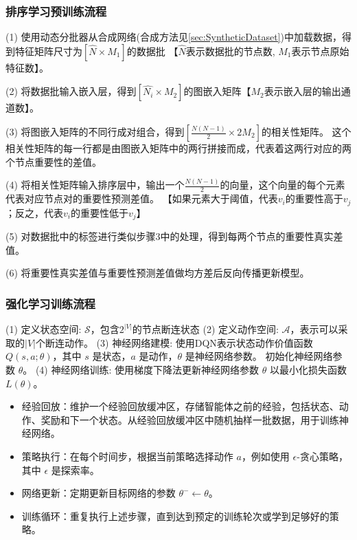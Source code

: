 \documentclass[twocolumn]{morningstar}
\begin{document}
\subsubsection{排序学习预训练流程}




(1) 使用动态分批器从合成网络(合成方法见\ref{sec:SyntheticDataset})中加载数据，得到特征矩阵尺寸为$[\hat{N}\times M_1]$的数据批
【$\hat{N}$表示数据批的节点数, $M_1$表示节点原始特征数】。

(2) 将数据批输入嵌入层，得到$[\hat{N_i}\times M_2]$的图嵌入矩阵【$M_2$表示嵌入层的输出通道数】。

(3) 将图嵌入矩阵的不同行成对组合，得到$[\frac{N(N-1)}{2} \times 2M_2]$的相关性矩阵。
这个相关性矩阵的每一行都是由图嵌入矩阵中的两行拼接而成，代表着这两行对应的两个节点重要性的差值。

(4) 将相关性矩阵输入排序层中，输出一个$\frac{N(N-1)}{2}$的向量，这个向量的每个元素代表对应节点对的重要性预测差值。
【如果元素大于阈值，代表$v_i$的重要性高于$v_j$；反之，代表$v_i$的重要性低于$v_j$】

(5) 对数据批中的标签进行类似步骤3中的处理，得到每两个节点的重要性真实差值。

(6) 将重要性真实差值与重要性预测差值做均方差后反向传播更新模型。

\subsubsection{强化学习训练流程}

(1) 定义状态空间: $\mathcal{S}$，包含$2^{|V|}$的节点断连状态
(2) 定义动作空间: $\mathcal{A}$，表示可以采取的$|V|$个断连动作。
(3) 神经网络建模: 使用DQN表示状态动作价值函数 $Q(s, a; \theta)$，其中 $s$ 是状态，$a$ 是动作，$\theta$ 是神经网络参数。
初始化神经网络参数 $\theta$。
(4) 神经网络训练: 使用梯度下降法更新神经网络参数 $\theta$ 以最小化损失函数 $L(\theta)$。

\begin{itemize}
    \item 经验回放：维护一个经验回放缓冲区，存储智能体之前的经验，包括状态、动作、奖励和下一个状态。从经验回放缓冲区中随机抽样一批数据，用于训练神经网络。
    \item 策略执行：在每个时间步，根据当前策略选择动作 $a$，例如使用 $\epsilon$-贪心策略，其中 $\epsilon$ 是探索率。
    \item 网络更新：定期更新目标网络的参数 $\theta^- \leftarrow \theta$。
    \item 训练循环：重复执行上述步骤，直到达到预定的训练轮次或学到足够好的策略。
\end{itemize}
\end{document}
